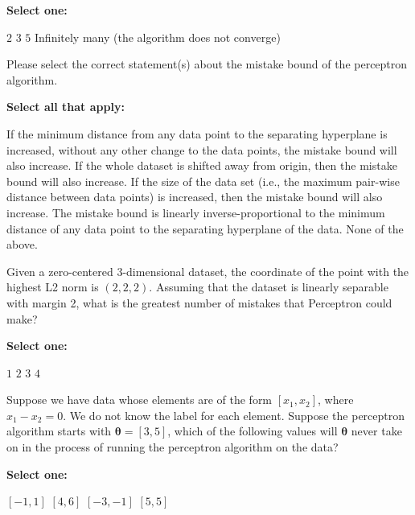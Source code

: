 \documentclass[11pt,addpoints,answers]{exam}
\numberwithin{equation}{section} %
\numberwithin{figure}{section} %
\numberwithin{table}{section} %
\begin{document}
\begin{questions}
    \textbf{Select one:}
    \begin{checkboxes}
        \choice $2$
        \choice $3$
        \choice $5$
        \choice Infinitely many (the algorithm does not converge)
    \end{checkboxes}

    
    
        
    
    \question[3] Please select the correct statement(s) about the mistake bound of the perceptron algorithm. 

    \textbf{Select all that apply:}
    {%
    \checkboxchar{$\Box$} \checkedchar{$\blacksquare$}
    \begin{checkboxes}
        \choice If the minimum distance from any data point to the separating hyperplane is increased, without any other change to the data points, the mistake bound will also increase.
        \choice If the whole dataset is shifted away from origin, then the mistake bound will also increase.
        \choice If the size of the data set (i.e., the maximum pair-wise distance between data points) is increased, then the mistake bound will also increase.
        \choice The mistake bound is linearly inverse-proportional to the minimum distance of any data point to the separating hyperplane of the data.
        \choice None of the above.
    \end{checkboxes}
    }



    \question[2] Given a zero-centered 3-dimensional dataset, the coordinate of the point with the highest L2 norm is $(2, 2, 2)$. Assuming that the dataset is linearly separable with margin 2, what is the greatest number of mistakes that Perceptron could make?

    \textbf{Select one:}
    \begin{checkboxes}
        \choice $1$
        \choice $2$
        \choice $3$
        \choice $4$
    \end{checkboxes}




\newpage
    \question[2] Suppose we have data whose elements are of the form $[x_1,x_2]$, where $x_1 - x_2 = 0$. We do not know the label for each element. Suppose the perceptron algorithm starts with $\bm{\theta} = [3,5]$, which of the following values will $\bm{\theta}$ never take on in the process of running the perceptron algorithm on the data?

    \textbf{Select one:}
    \begin{checkboxes}
        \choice $[-1,1]$
        \choice $[4,6]$
        \choice $[-3,-1]$
        \choice $[5,5]$
    \end{checkboxes}


\end{questions}
\end{document}
